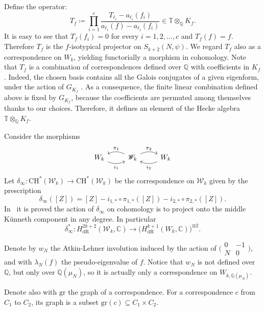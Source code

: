 \documentclass[10pt,a4paper]{amsart}
\newcommand{\KS}{\mathscr{W}}
\newcommand{\C}{\numberset{C}}
\newcommand{\CH}{\mathrm{CH}}
\newcommand{\Q}{\numberset{Q}}
\DeclareMathOperator{\dR}{dR}
\newcommand{\numberset}{\mathbb}
\begin{document}
\begin{list}{}
        Define the operator:
        \[
            T_f \coloneqq \prod_{i=1}^c \frac{T_{\ell_i} - a_{\ell_i}(f_i)}{a_{\ell_i}(f) - a_{\ell_i}(f_i)} \in \mathbb{T}\otimes_{\Q} K_f.
        \]
        It is easy to see that $T_f(f_i) = 0$ for every $i=1,2,\ldots,c$ and $T_f(f) = f$. Therefore $T_f$ is the $f$-isotypical projector on $S_{k+2}(N,\psi)$. We regard $T_f$ also as a correspondence on $W_k$, yielding functorially a morphism in cohomology. Note that $T_f$ is a combination of correspondences defined over $\Q$ with coefficients in $K_f$. Indeed, the chosen basis contains all the Galois conjugates of a given eigenform, under the action of $G_{K_f}$ . As a consequence, the finite linear combination defined above is fixed by $G_{K_f}$, because the coefficients are permuted among themselves thanks to our choices. Therefore, it defines an element of the Hecke algebra $\mathbb{T}\otimes_{\Q} K_f$.
    \item[Projection onto the middle Künneth component] Consider the morphisms
        \[
            \begin{tikzcd}
                W_k \arrow[bend right=25,"i_1",swap]{r} & \KS_k \arrow[bend left=25,"\pi_2"]{r} \arrow[bend right=25,"\pi_1",swap]{l} & W_k \arrow[bend left=25,"i_2"]{l}
            \end{tikzcd}
        \]
        Let $\delta_{\infty} \colon \CH^*(\KS_k) \to \CH^*(\KS_k)$ be the correspondence on $\KS_k$ given by the prescription
        \[
            \delta_{\infty}([Z]) = [Z] - i_{1,*}\circ\pi_{1,*}([Z]) - i_{2,*}\circ\pi_{2,*}([Z]).
        \]
        In~\cite[§2]{darmonrotger12} it is proved the action of $\delta_{\infty}$ on cohomology is to project onto the middle Künneth component in any degree. In particular
        \[
            \delta_{\infty}^* \colon H^{2k+2}_{\dR}(\KS_k,\C) \to \bigl(H^{k+1}_{\dR}(W_k,\C)\bigr)^{\otimes 2}.
        \]
    \item[Atkin-Lehner involution] Denote by $w_N$ the Atkin-Lehner involution induced by the action of $\bigl(\begin{smallmatrix} 0 & -1 \\ N & 0 \end{smallmatrix}\bigr)$, and with $\lambda_N(f)$ the pseudo-eigenvalue of $f$. Notice that $w_N$ is not defined over $\Q$, but only over $\Q(\mu_N)$, so it is actually only a correspondence on $W_{k,\Q(\mu_N)}$.
\end{list}
Denote also with $\mathrm{gr}$ the graph of a correspondence. For a correspondence $c$ from $C_1$ to $C_2$, its graph is a subset $\mathrm{gr}(c) \subseteq C_1 \times C_2$.
\end{document}
